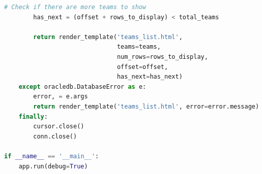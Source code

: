 \begin{lstlisting}[language=python]
        # Check if there are more teams to show
        has_next = (offset + rows_to_display) < total_teams
        
        return render_template('teams_list.html',
                               teams=teams,
                               num_rows=rows_to_display,
                               offset=offset,
                               has_next=has_next)
    except oracledb.DatabaseError as e:
        error, = e.args
        return render_template('teams_list.html', error=error.message)
    finally:
        cursor.close()
        conn.close()

if __name__ == '__main__':
    app.run(debug=True)
\end{lstlisting}